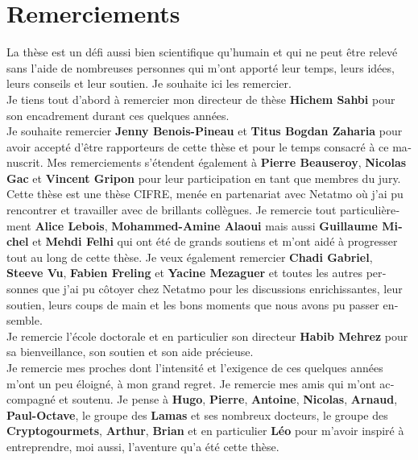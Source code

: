 \chapter*{Remerciements}
\begin{otherlanguage}{french}


\indent La thèse est un défi aussi bien scientifique qu'humain et qui ne peut
être relevé sans l'aide de nombreuses personnes qui m'ont apporté leur temps,
leurs idées, leurs conseils et leur soutien. Je souhaite ici les remercier.\\

Je tiens tout d'abord à remercier mon directeur de thèse \textbf{Hichem Sahbi}
pour son encadrement durant ces quelques années.\\

Je souhaite remercier \textbf{Jenny Benois-Pineau} et \textbf{Titus Bogdan
Zaharia} pour avoir accepté d'être rapporteurs de cette thèse et pour le temps
consacré à ce manuscrit. Mes remerciements s'étendent également à \textbf{Pierre
Beauseroy}, \textbf{Nicolas Gac} et \textbf{Vincent Gripon} pour leur
participation en tant que membres du jury.\\

Cette thèse est une thèse CIFRE, menée en partenariat avec Netatmo où j'ai pu
rencontrer et travailler avec de brillants collègues. Je remercie tout
particulièrement \textbf{Alice Lebois}, \textbf{Mohammed-Amine Alaoui} mais
aussi \textbf{Guillaume Michel} et \textbf{Mehdi Felhi} qui ont été de grands
soutiens et m'ont aidé à progresser tout au long de cette thèse. Je veux
également remercier \textbf{Chadi Gabriel}, \textbf{Steeve Vu}, \textbf{Fabien
Freling} et \textbf{Yacine Mezaguer} et toutes les autres personnes que j'ai pu
côtoyer chez Netatmo pour les discussions enrichissantes, leur soutien, leurs
coups de main et les bons moments que nous avons pu passer ensemble.\\

Je remercie l'école doctorale et en particulier son directeur \textbf{Habib
Mehrez} pour sa bienveillance, son soutien et son aide précieuse.\\

Je remercie mes proches dont l'intensité et l'exigence de ces quelques années
m'ont un peu éloigné, à mon grand regret. Je remercie mes amis qui m'ont
accompagné et soutenu. Je pense à \textbf{Hugo}, \textbf{Pierre},
\textbf{Antoine}, \textbf{Nicolas}, \textbf{Arnaud}, \textbf{Paul-Octave}, le
groupe des \textbf{Lamas} et ses nombreux docteurs, le groupe des
\textbf{Cryptogourmets}, \textbf{Arthur}, \textbf{Brian} et en particulier
\textbf{Léo} pour m'avoir inspiré à entreprendre, moi aussi, l'aventure qu'a été
cette thèse.\\


\end{otherlanguage}
